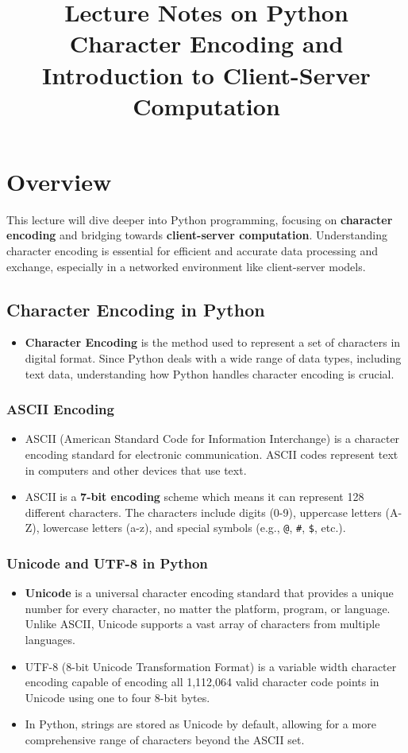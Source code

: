 \documentclass{article}
\title{Lecture Notes on Python Character Encoding and Introduction to Client-Server Computation}
\author{}
\date{}
\begin{document}
\maketitle
\tableofcontents
\newpage

\section{Overview}
This lecture will dive deeper into Python programming, focusing on \textbf{character encoding} and bridging towards \textbf{client-server computation}. Understanding character encoding is essential for efficient and accurate data processing and exchange, especially in a networked environment like client-server models.

\subsection{Character Encoding in Python}
\begin{itemize}
    \item \textbf{Character Encoding} is the method used to represent a set of characters in digital format. Since Python deals with a wide range of data types, including text data, understanding how Python handles character encoding is crucial.
\end{itemize}

\subsubsection{ASCII Encoding}
\begin{itemize}
    \item ASCII (American Standard Code for Information Interchange) is a character encoding standard for electronic communication. ASCII codes represent text in computers and other devices that use text.
    \item ASCII is a \textbf{7-bit encoding} scheme which means it can represent 128 different characters. The characters include digits (0-9), uppercase letters (A-Z), lowercase letters (a-z), and special symbols (e.g., \texttt{@}, \texttt{\#}, \texttt{\$}, etc.).
\end{itemize}

\subsubsection{Unicode and UTF-8 in Python}
\begin{itemize}
    \item \textbf{Unicode} is a universal character encoding standard that provides a unique number for every character, no matter the platform, program, or language. Unlike ASCII, Unicode supports a vast array of characters from multiple languages.
    \item UTF-8 (8-bit Unicode Transformation Format) is a variable width character encoding capable of encoding all 1,112,064 valid character code points in Unicode using one to four 8-bit bytes.
    \item In Python, strings are stored as Unicode by default, allowing for a more comprehensive range of characters beyond the ASCII set.
\end{itemize}
\end{document}
